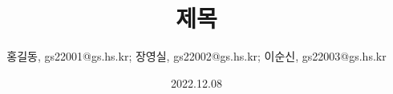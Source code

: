 \title{제목}
\authorsuptrue
\author{홍길동, gs22001@gs.hs.kr; 장영실, gs22002@gs.hs.kr; 이순신, gs22003@gs.hs.kr}
\date{2022.12.08}

\renewcommand{\abstractname}{요\hskip 2pc 약}
\renewcommand{\contentsname}{목차}
